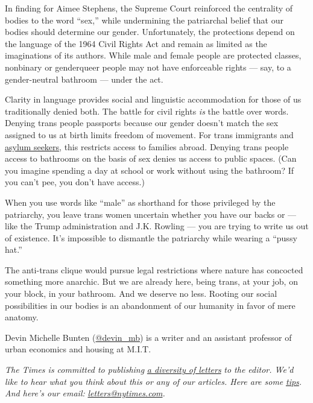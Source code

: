 In finding for Aimee Stephens, the Supreme Court reinforced the
centrality of bodies to the word ``sex,'' while undermining the
patriarchal belief that our bodies should determine our gender.
Unfortunately, the protections depend on the language of the 1964 Civil
Rights Act and remain as limited as the imaginations of its authors.
While male and female people are protected classes, nonbinary or
genderqueer people may not have enforceable rights --- say, to a
gender-neutral bathroom --- under the act.

Clarity in language provides social and linguistic accommodation for
those of us traditionally denied both. The battle for civil rights
\emph{is} the battle over words. Denying trans people passports because
our gender doesn't match the sex assigned to us at birth limits freedom
of movement. For trans immigrants and
\href{https://www.hrc.org/blog/the-precarious-position-of-transgender-immigrants-and-asylum-seekers}{asylum
seekers}, this restricts access to families abroad. Denying trans people
access to bathrooms on the basis of sex denies us access to public
spaces. (Can you imagine spending a day at school or work without using
the bathroom? If you can't pee, you don't have access.)

When you use words like ``male'' as shorthand for those privileged by
the patriarchy, you leave trans women uncertain whether you have our
backs or --- like the Trump administration and J.K. Rowling --- you are
trying to write us out of existence. It's impossible to dismantle the
patriarchy while wearing a ``pussy hat.''

The anti-trans clique would pursue legal restrictions where nature has
concocted something more anarchic. But we are already here, being trans,
at your job, on your block, in your bathroom. And we deserve no less.
Rooting our social possibilities in our bodies is an abandonment of our
humanity in favor of mere anatomy.

Devin Michelle Bunten (\href{https://twitter.com/devin_mb}{@devin\_mb})
is a writer and an assistant professor of urban economics and housing at
M.I.T.

\emph{The Times is committed to publishing}
\href{https://www.nytimes.com/2019/01/31/opinion/letters/letters-to-editor-new-york-times-women.html}{\emph{a
diversity of letters}} \emph{to the editor. We'd like to hear what you
think about this or any of our articles. Here are some}
\href{https://help.nytimes.com/hc/en-us/articles/115014925288-How-to-submit-a-letter-to-the-editor}{\emph{tips}}\emph{.
And here's our email:}
\href{mailto:letters@nytimes.com}{\emph{letters@nytimes.com}}\emph{.}

